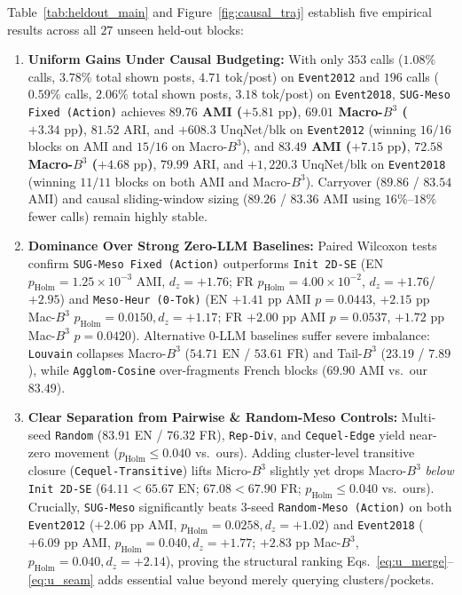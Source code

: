 Table~\ref{tab:heldout_main} and Figure~\ref{fig:causal_traj} establish five empirical results across all $27$ unseen held-out blocks:
\begin{enumerate}
    \item \textbf{Uniform Gains Under Causal Budgeting:} With only $353$ calls ($1.08\%$ calls, $3.78\%$ total shown posts, $4.71$ tok/post) on \texttt{Event2012} and $196$ calls ($0.59\%$ calls, $2.06\%$ total shown posts, $3.18$ tok/post) on \texttt{Event2018}, \texttt{SUG-Meso Fixed (Action)} achieves \textbf{$89.76$ AMI ($+5.81\text{ pp}$)}, \textbf{$69.01$ Macro-$B^3$ ($+3.34\text{ pp}$)}, $81.52$ ARI, and $+608.3$ UnqNet/blk on \texttt{Event2012} (winning $16/16$ blocks on AMI and $15/16$ on Macro-$B^3$), and \textbf{$83.49$ AMI ($+7.15\text{ pp}$)}, \textbf{$72.58$ Macro-$B^3$ ($+4.68\text{ pp}$)}, $79.99$ ARI, and $+1{,}220.3$ UnqNet/blk on \texttt{Event2018} (winning $11/11$ blocks on both AMI and Macro-$B^3$). Carryover ($89.86$ / $83.54$ AMI) and causal sliding-window sizing ($89.26$ / $83.36$ AMI using $16\%$--$18\%$ fewer calls) remain highly stable.
    \item \textbf{Dominance Over Strong Zero-LLM Baselines:} Paired Wilcoxon tests confirm \texttt{SUG-Meso Fixed (Action)} outperforms \texttt{Init 2D-SE} (EN $p_{\text{Holm}}=1.25\times 10^{-3}$ AMI, $d_z=+1.76$; FR $p_{\text{Holm}}=4.00\times 10^{-2}$, $d_z=+1.76$/$+2.95$) and \texttt{Meso-Heur (0-Tok)} (EN $+1.41\text{ pp}$ AMI $p=0.0443$, $+2.15\text{ pp}$ Mac-$B^3$ $p_{\text{Holm}}=0.0150, d_z=+1.17$; FR $+2.00\text{ pp}$ AMI $p=0.0537$, $+1.72\text{ pp}$ Mac-$B^3$ $p=0.0420$). Alternative 0-LLM baselines suffer severe imbalance: \texttt{Louvain} collapses Macro-$B^3$ ($54.71$ EN / $53.61$ FR) and Tail-$B^3$ ($23.19$ / $7.89$), while \texttt{Agglom-Cosine} over-fragments French blocks ($69.90$ AMI vs.\ our $83.49$).
    \item \textbf{Clear Separation from Pairwise \& Random-Meso Controls:} Multi-seed \texttt{Random} ($83.91$ EN / $76.32$ FR), \texttt{Rep-Div}, and \texttt{Cequel-Edge} yield near-zero movement ($p_{\text{Holm}} \le 0.040$ vs.\ ours). Adding cluster-level transitive closure (\texttt{Cequel-Transitive}) lifts Micro-$B^3$ slightly yet drops Macro-$B^3$ \emph{below} \texttt{Init 2D-SE} ($64.11 < 65.67$ EN; $67.08 < 67.90$ FR; $p_{\text{Holm}} \le 0.040$ vs.\ ours). Crucially, \texttt{SUG-Meso} significantly beats $3$-seed \texttt{Random-Meso (Action)} on both \texttt{Event2012} ($+2.06\text{ pp}$ AMI, $p_{\text{Holm}}=0.0258, d_z=+1.02$) and \texttt{Event2018} ($+6.09\text{ pp}$ AMI, $p_{\text{Holm}}=0.040, d_z=+1.77$; $+2.83\text{ pp}$ Mac-$B^3$, $p_{\text{Holm}}=0.040, d_z=+2.14$), proving the structural ranking Eqs.~\eqref{eq:u_merge}--\eqref{eq:u_seam} adds essential value beyond merely querying clusters/pockets.

\end{enumerate}
